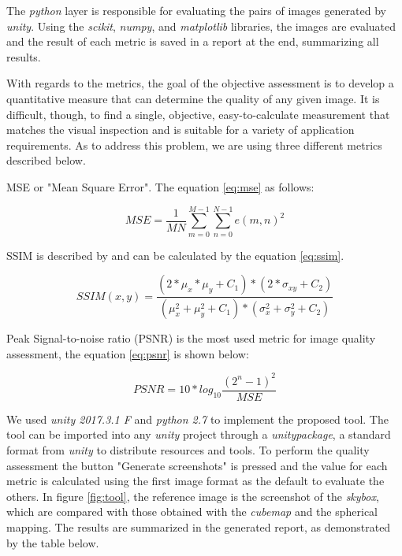 \documentclass[12pt]{article}
\begin{document}
The \textit{python} layer is responsible for evaluating the pairs of images generated by \textit{unity}. Using the \textit{scikit}, \textit{numpy}, and \textit{matplotlib} libraries, the images are evaluated and the result of each metric is saved in a report at the end, summarizing all results.

With regards to the metrics, the goal of the objective assessment is to develop a quantitative measure that can determine the quality of any given image. It is difficult, though, to find a single, objective, easy-to-calculate measurement that matches the visual inspection and is suitable for a variety of application requirements. As to address this problem, we are using three different metrics described below.

MSE or "Mean Square Error". The equation \ref{eq:mse} as follows:

\begin{equation}
MSE=\frac{1}{MN}\sum_{m=0}^{M-1}{\sum_{n=0}^{N-1}{e(m,n)^2}}
\label{eq:mse}
\end{equation}

SSIM is described by \cite{wang2004image} and can be calculated by the equation \ref{eq:ssim}.

\begin{equation}
SSIM(x,y)=\frac{(2*\mu_x*\mu_y+C_1)*(2*\sigma_{xy}+C_2)}{(\mu^2_x+\mu^2_y+C_1)*(\sigma^2_x+\sigma^2_y+C_2)}
\label{eq:ssim}
\end{equation}

Peak Signal-to-noise ratio (PSNR) is the most used metric for image quality assessment, the equation \ref{eq:psnr} is shown below:

\begin{equation}
PSNR = 10*log_{10}{\frac{(2^n-1)^2}{MSE}}
\label{eq:psnr}
\end{equation}

We used \textit{unity 2017.3.1 F} and \textit{python 2.7} to implement the proposed tool. The tool can be imported into any \textit{unity} project through a \textit{unitypackage}, a standard format from \textit{unity} to distribute resources and tools. To perform the quality assessment the button "Generate screenshots" is pressed and the value for each metric is calculated using the first image format as the default to evaluate the others. In figure \ref{fig:tool}, the reference image is the screenshot of the \textit{skybox}, which are compared with those obtained with the \textit{cubemap} and the spherical mapping. The results are summarized in the generated report, as demonstrated by the table below.
\end{document}
